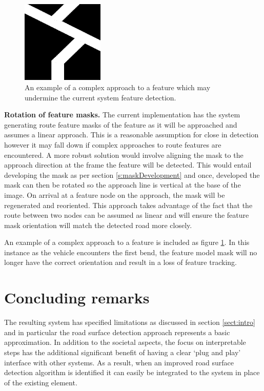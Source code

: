 \documentclass[]{aiaa-tc}%
\begin{document}
\begin{figure} %
	\centering
	\includegraphics[width=0.35\textwidth]{complexFeatureApproach.png}
	\caption{An example of a complex approach to a feature which may undermine the current system feature detection.}
	\label{f:complexFeatureApproach}
\end{figure}

\textbf{Rotation of feature masks.} The current implementation has the system generating route feature masks of the feature as it will be approached and assumes a linear approach. This is a reasonable assumption for close in detection however it may fall down if complex approaches to route features are encountered. A more robust solution would involve aligning the mask to the approach direction at the frame the feature will be detected. This would entail developing the mask as per section \ref{s:maskDevelopment} and once, developed the mask can then be rotated so the approach line is vertical at the base of the image. On arrival at a feature node on the approach, the mask will be regenerated and reoriented. This approach takes advantage of the fact that the route between two nodes can be assumed as linear and will ensure the feature mask orientation will match the detected road more closely. 

An example of a complex approach to a feature is included as figure \ref{f:complexFeatureApproach}. In this instance as the vehicle encounters the first bend, the feature model mask will no longer have the correct orientation and result in a loss of feature tracking. 

\section{Concluding remarks}

The resulting system has specified limitations as discussed in section \ref{sect:intro} and in particular the road surface detection approach represents a basic approximation. In addition to the societal aspects, the focus on interpretable steps has the additional significant benefit of having a clear `plug and play' interface with other systems. As a result, when an improved road surface detection algorithm is identified it can easily be integrated to the system in place of the existing element. 
\end{document}
